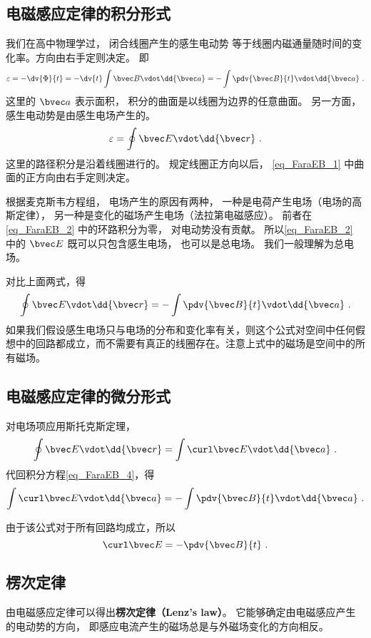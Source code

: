 
\begin{issues}
\issueAbstract
\issueTODO
\end{issues}


\subsection{电磁感应定律的积分形式}

我们在高中物理学过， 闭合线圈产生的感生电动势 %
等于线圈内磁通量随时间的变化率。方向由右手定则决定。 即
\begin{equation}\label{eq_FaraEB_1}
\varepsilon  =  -\dv{\Phi}{t} =  - \dv{t} \int \bvec B \vdot \dd{\bvec a} =  - \int \pdv{\bvec B}{t} \vdot \dd{\bvec a}~.
\end{equation} 
这里的 $\bvec a$ 表示面积， 积分的曲面是以线圈为边界的任意曲面。 另一方面，感生电动势是由感生电场产生的。 
\begin{equation}\label{eq_FaraEB_2}
\varepsilon  = \oint \bvec E \vdot \dd{\bvec r}~.
\end{equation}
这里的路径积分是沿着线圈进行的。 规定线圈正方向以后， \autoref{eq_FaraEB_1} 中曲面的正方向由右手定则决定。

根据麦克斯韦方程组， 电场产生的原因有两种， 一种是电荷产生电场（电场的高斯定律）， 另一种是变化的磁场产生电场（法拉第电磁感应）。 前者在\autoref{eq_FaraEB_2} 中的环路积分为零， 对电动势没有贡献。 所以\autoref{eq_FaraEB_2} 中的 $\bvec E$ 既可以只包含感生电场， 也可以是总电场。 我们一般理解为总电场。

对比上面两式，得
\begin{equation}\label{eq_FaraEB_4}
\oint \bvec E \vdot \dd{\bvec r}  =  - \int \pdv{\bvec B}{t} \vdot \dd{\bvec a} ~.
\end{equation} 
如果我们假设感生电场只与电场的分布和变化率有关，则这个公式对空间中任何假想中的回路都成立，而不需要有真正的线圈存在。注意上式中的磁场是空间中的所有磁场。

\subsection{电磁感应定律的微分形式}

对电场项应用斯托克斯定理， 
\begin{equation}
\oint \bvec E \vdot \dd{\bvec r}  = \int \curl \bvec E \vdot \dd{\bvec a}~.
\end{equation}
代回积分方程\autoref{eq_FaraEB_4}，得
\begin{equation}
\int \curl \bvec E \vdot\dd{\bvec a}  =  - \int \pdv{\bvec B}{t} \vdot \dd{\bvec a} ~.
\end{equation} 

由于该公式对于所有回路均成立，所以
\begin{equation}\label{eq_FaraEB_3}
\curl \bvec E =  - \pdv{\bvec B}{t}~.
\end{equation} 

\subsection{楞次定律}
由电磁感应定律可以得出\textbf{楞次定律（Lenz's law）}。 它能够确定由电磁感应产生的电动势的方向， 即感应电流产生的磁场总是与外磁场变化的方向相反。 
